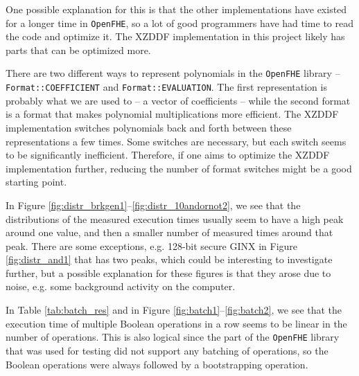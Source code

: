One possible explanation for this is that the other implementations have existed for a longer time in \texttt{OpenFHE}, so a lot of good programmers have had time to read the code and optimize it. The XZDDF implementation in this project likely has parts that can be optimized more.

There are two different ways to represent polynomials in the \texttt{OpenFHE} library -- \texttt{Format::COEFFICIENT} and \texttt{Format::EVALUATION}. The first representation is probably what we are used to -- a vector of coefficients -- while the second format is a format that makes polynomial multiplications more efficient. The XZDDF implementation switches polynomials back and forth between these representations a few times. Some switches are necessary, but each switch seems to be significantly inefficient. Therefore, if one aims to optimize the XZDDF implementation further, reducing the number of format switches might be a good starting point.

In Figure \ref{fig:distr_brkgen1}--\ref{fig:distr_10andornot2}, we see that the distributions of the measured execution times usually seem to have a high peak around one value, and then a smaller number of measured times around that peak. There are some exceptions, e.g. 128-bit secure GINX in Figure \ref{fig:distr_and1} that has two peaks, which could be interesting to investigate further, but a possible explanation for these figures is that they arose due to noise, e.g. some background activity on the computer.

In Table \ref{tab:batch_res} and in Figure \ref{fig:batch1}--\ref{fig:batch2}, we see that the execution time of multiple Boolean operations in a row seems to be linear in the number of operations. This is also logical since the part of the \texttt{OpenFHE} library that was used for testing did not support any batching of operations, so the Boolean operations were always followed by a bootstrapping operation.


